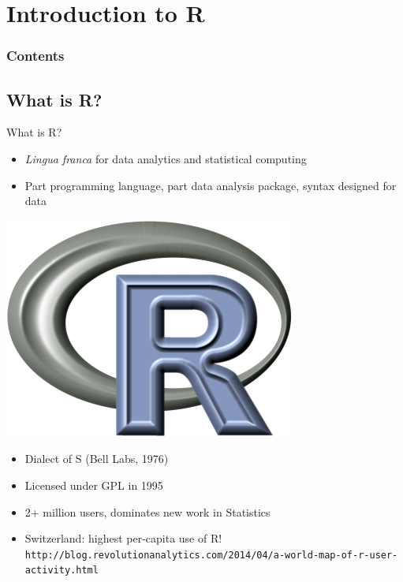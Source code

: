 \section{Introduction to R}

\hidenum
\begin{frame}[noframenumbering]
\frametitle{Contents}
\end{frame}
\shownum

\subsection{What is R?}

\begin{frame}
  \begin{block}{What is R?}\pause
  \begin{minipage}{.75\textwidth}
  \begin{itemize}[<+-|alert@+>]
    \item \emph{Lingua franca} for data analytics and statistical computing
    \item Part programming language, part data analysis
      package, syntax designed for data
  \end{itemize}
  \end{minipage}
  \hfill
  \begin{minipage}{.2\textwidth}
    \centering\includegraphics[scale=.5]{../common/pics/logos/Rlogo_clear}
  \end{minipage}
  \begin{itemize}
    \item Dialect of S (Bell Labs, 1976)
    \item Licensed under GPL in 1995
    \item 2+ million users, dominates new work in Statistics
    \item Switzerland: highest per-capita use of R!
      {\tiny\tt http://blog.revolutionanalytics.com/2014/04/a-world-map-of-r-user-activity.html}
  \end{itemize}
\end{block}
\end{frame}


